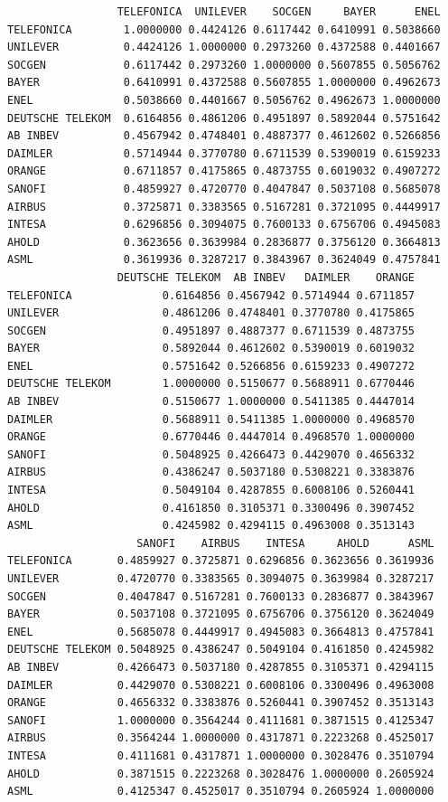 \documentclass[
  12pt,
  a4paper,
  openany]{book}
\begin{document}
\begin{verbatim}
                 TELEFONICA  UNILEVER    SOCGEN     BAYER      ENEL
TELEFONICA        1.0000000 0.4424126 0.6117442 0.6410991 0.5038660
UNILEVER          0.4424126 1.0000000 0.2973260 0.4372588 0.4401667
SOCGEN            0.6117442 0.2973260 1.0000000 0.5607855 0.5056762
BAYER             0.6410991 0.4372588 0.5607855 1.0000000 0.4962673
ENEL              0.5038660 0.4401667 0.5056762 0.4962673 1.0000000
DEUTSCHE TELEKOM  0.6164856 0.4861206 0.4951897 0.5892044 0.5751642
AB INBEV          0.4567942 0.4748401 0.4887377 0.4612602 0.5266856
DAIMLER           0.5714944 0.3770780 0.6711539 0.5390019 0.6159233
ORANGE            0.6711857 0.4175865 0.4873755 0.6019032 0.4907272
SANOFI            0.4859927 0.4720770 0.4047847 0.5037108 0.5685078
AIRBUS            0.3725871 0.3383565 0.5167281 0.3721095 0.4449917
INTESA            0.6296856 0.3094075 0.7600133 0.6756706 0.4945083
AHOLD             0.3623656 0.3639984 0.2836877 0.3756120 0.3664813
ASML              0.3619936 0.3287217 0.3843967 0.3624049 0.4757841
                 DEUTSCHE TELEKOM  AB INBEV   DAIMLER    ORANGE
TELEFONICA              0.6164856 0.4567942 0.5714944 0.6711857
UNILEVER                0.4861206 0.4748401 0.3770780 0.4175865
SOCGEN                  0.4951897 0.4887377 0.6711539 0.4873755
BAYER                   0.5892044 0.4612602 0.5390019 0.6019032
ENEL                    0.5751642 0.5266856 0.6159233 0.4907272
DEUTSCHE TELEKOM        1.0000000 0.5150677 0.5688911 0.6770446
AB INBEV                0.5150677 1.0000000 0.5411385 0.4447014
DAIMLER                 0.5688911 0.5411385 1.0000000 0.4968570
ORANGE                  0.6770446 0.4447014 0.4968570 1.0000000
SANOFI                  0.5048925 0.4266473 0.4429070 0.4656332
AIRBUS                  0.4386247 0.5037180 0.5308221 0.3383876
INTESA                  0.5049104 0.4287855 0.6008106 0.5260441
AHOLD                   0.4161850 0.3105371 0.3300496 0.3907452
ASML                    0.4245982 0.4294115 0.4963008 0.3513143
                    SANOFI    AIRBUS    INTESA     AHOLD      ASML
TELEFONICA       0.4859927 0.3725871 0.6296856 0.3623656 0.3619936
UNILEVER         0.4720770 0.3383565 0.3094075 0.3639984 0.3287217
SOCGEN           0.4047847 0.5167281 0.7600133 0.2836877 0.3843967
BAYER            0.5037108 0.3721095 0.6756706 0.3756120 0.3624049
ENEL             0.5685078 0.4449917 0.4945083 0.3664813 0.4757841
DEUTSCHE TELEKOM 0.5048925 0.4386247 0.5049104 0.4161850 0.4245982
AB INBEV         0.4266473 0.5037180 0.4287855 0.3105371 0.4294115
DAIMLER          0.4429070 0.5308221 0.6008106 0.3300496 0.4963008
ORANGE           0.4656332 0.3383876 0.5260441 0.3907452 0.3513143
SANOFI           1.0000000 0.3564244 0.4111681 0.3871515 0.4125347
AIRBUS           0.3564244 1.0000000 0.4317871 0.2223268 0.4525017
INTESA           0.4111681 0.4317871 1.0000000 0.3028476 0.3510794
AHOLD            0.3871515 0.2223268 0.3028476 1.0000000 0.2605924
ASML             0.4125347 0.4525017 0.3510794 0.2605924 1.0000000
\end{verbatim}
\end{document}
